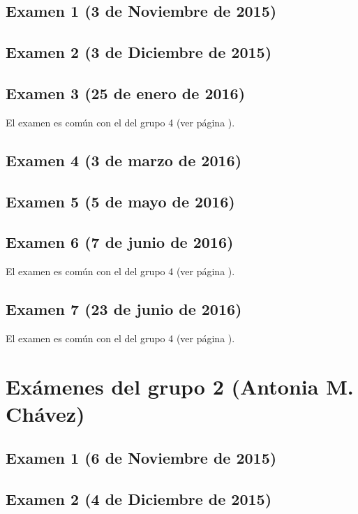 \documentclass[a4paper,12pt,twoside]{book}
\begin{document}
\subsection{Examen 1 (3 de Noviembre de 2015)}
\subsection{Examen 2 (3 de Diciembre de 2015)}
\subsection{Examen 3 (25 de enero de 2016)}
El examen es común con el del grupo 4 (ver página \pageref{examen_15_16_4_3}).
\subsection{Examen 4 (3 de marzo de 2016)}
\subsection{Examen 5 (5 de mayo de 2016)}
\subsection{Examen 6 (7 de junio de 2016)} 
El examen es común con el del grupo 4 (ver página \pageref{examen_15_16_4_6}).
\subsection{Examen 7 (23 de junio de 2016)}
El examen es común con el del grupo 4 (ver página \pageref{examen_15_16_4_7}).

\section{Exámenes del grupo 2 (Antonia M. Chávez)}
\subsection{Examen 1 (6 de Noviembre de 2015)}
\subsection{Examen 2 (4 de Diciembre de 2015)}
\end{document}
